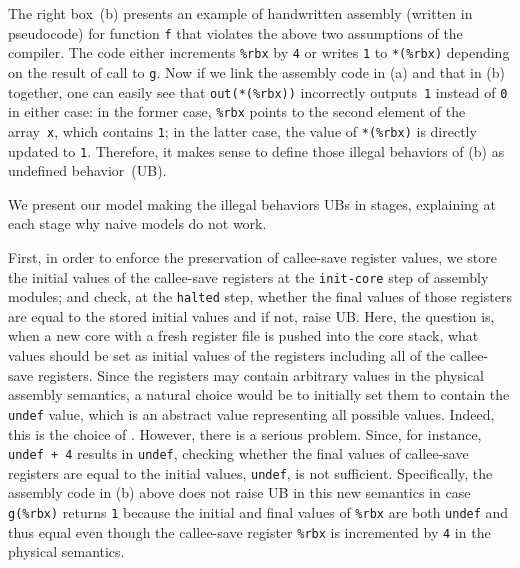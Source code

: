 The right box~(b) presents an example of handwritten assembly
(written in pseudocode) for function \texttt{f} that violates the
above two assumptions of the compiler. The code either increments
\texttt{\%rbx} by \texttt{4} or writes \texttt{1} to \texttt{*(\%rbx)}
depending on the result of call to \texttt{g}.  Now if we link the assembly
code in (a) and that in (b) together, one can easily see that
\texttt{out(*(\%rbx))} incorrectly outputs~\texttt{1} instead
of \texttt{0} in either case: in the former case, \texttt{\%rbx}
points to the second element of the array~\texttt{x}, which contains
\texttt{1}; in the latter case, the value of \texttt{*(\%rbx)} is
directly updated to \texttt{1}. Therefore, it makes sense to
define those illegal behaviors of (b) as undefined behavior~(UB).

%
We present our model making the illegal behaviors UBs
in stages, explaining at each stage why naive models do not work.

First, in order to enforce the preservation of callee-save register
values, we store the initial values of the callee-save registers at
the \texttt{init-core} step of assembly modules; and check, at the
\texttt{halted} step, whether the final values of those registers are
equal to the stored initial values and if not, raise UB.  Here, the
question is, when a new core with a fresh register file is pushed into the core stack,
what values should be set as initial values of the \nip{}
registers including all of the callee-save registers.  Since the
registers may contain arbitrary values in the physical assembly
semantics, a natural choice would be to initially set them to contain
the \texttt{undef} value, which is an abstract value representing all
possible values. Indeed, this is the choice of \ccc{}.  However, there
is a serious problem. Since, for instance, \texttt{undef + 4} results
in \texttt{undef}, checking whether the final values of callee-save
registers are equal to the initial values, \ie \texttt{undef}, is
not sufficient. Specifically, the assembly code in (b) above
does not raise UB in this new semantics in case \texttt{g(\%rbx)} returns \texttt{1}
because the initial and final values of \texttt{\%rbx}
are both \texttt{undef} and thus equal
even though the callee-save register \texttt{\%rbx} is incremented
by \texttt{4} in the physical semantics.

